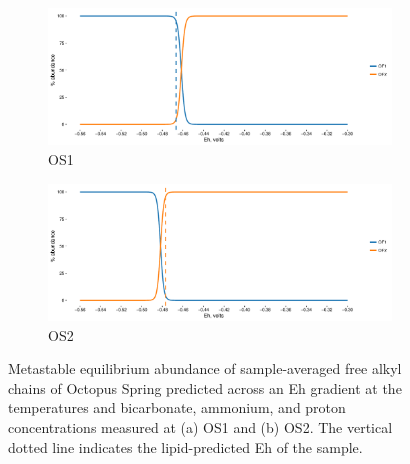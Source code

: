 \newpage

\begin{figure}[h]
\centering

    \begin{subfigure}[b]{\linewidth}
       	\includegraphics[width=1\linewidth]{"figs_app2/Octopus OF1_thermo"}
       	\caption{OS1}
        \label{fig:OS1_thermo}
    \end{subfigure}
    \begin{subfigure}[b]{\linewidth}
    	\includegraphics[width=1\linewidth]{"figs_app2/Octopus OF2_thermo"}
    	\caption{OS2}
        \label{fig:OS2_thermo}
    \end{subfigure}
    
    \caption[Metastable equilibrium abundance of sample-averaged free alkyl chains of Octopus Spring]{Metastable equilibrium abundance of sample-averaged free alkyl chains of Octopus Spring predicted across an Eh gradient at the temperatures and bicarbonate, ammonium, and proton concentrations measured at (a) OS1 and (b) OS2. The vertical dotted line indicates the lipid-predicted Eh of the sample.}
    \label{fig:OS_thermo}
\end{figure}

\newpage

